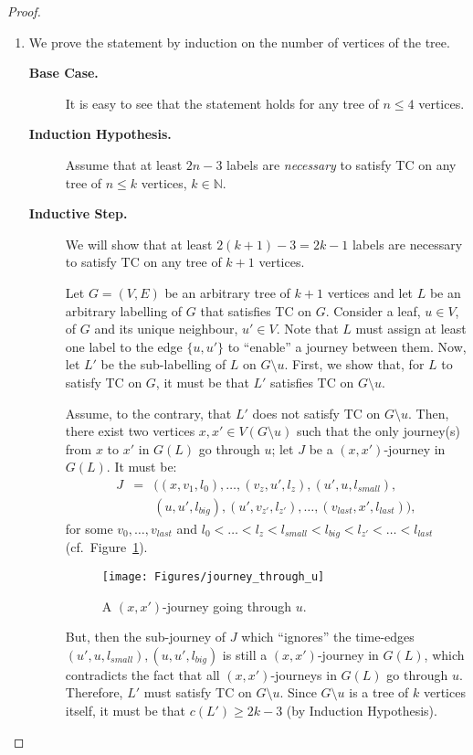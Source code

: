 \documentclass[a4paper,UKenglish]{article}
\begin{document}
\begin{proof}
\begin{enumerate}[label=(\alph*)]

\item\label{item:tree_lower_bound} We prove the statement by induction on the number of vertices of the tree.
\begin{description}
\item[\textbf{Base Case.}] \noindent It is easy to see that the statement holds for any tree of $n\leq 4$ vertices.

\item[\textbf{Induction Hypothesis.}] \noindent Assume that at least $2n-3$ labels are \emph{necessary} to satisfy TC on any tree of $n\leq k$ vertices, $k\in \mathbb{N}$.

\item[\textbf{Inductive Step.}] \noindent We will show that at least $2(k+1)-3=2k-1$ labels are necessary to satisfy TC on any tree of $k+1$ vertices.

Let $G=(V,E)$ be an arbitrary tree of $k+1$ vertices and let $L$ be an arbitrary labelling of $G$ that satisfies TC on $G$. Consider a leaf, $u \in V$, of $G$ and its unique neighbour, $u' \in V$. Note that $L$ must assign at least one label to the edge $\{u,u'\}$ to ``enable'' a journey between them. Now, let $L'$ be the sub-labelling of $L$ on $G\setminus u$. First, we show that, for $L$ to satisfy TC on $G$, it must be that $L'$ satisfies TC on $G \setminus u$.

Assume, to the contrary, that $L'$ does not satisfy TC on $G \setminus u$. Then, there exist two vertices $x,x' \in V(G\setminus u)$ such that the only journey(s) from $x$ to $x'$ in $G(L)$ go through $u$; let $J$ be a $(x,x')$-journey in $G(L)$. It must be:
\begin{eqnarray*}
J &=& \big(  (x,v_1,l_0), \ldots, (v_z,u',l_z), (u',u,l_{small}), \\
  & & (u,u',l_{big}), (u',v_{z'},l_{z'}), \ldots, (v_{last},x',l_{last}) \big) ,
\end{eqnarray*}
for some $v_0, \ldots, v_{last}$ and $l_0<\ldots< l_z<l_{small}<l_{big}< l_{z'} < \ldots <l_{last}$ (cf.~Figure~\ref{fig:journey_through_u}).
\begin{figure}[!htb]
\centering
\texttt{[image: Figures/journey\_through\_u]}
\caption{A $(x,x')$-journey going through $u$.}
\label{fig:journey_through_u}
\end{figure}

But, then the sub-journey of $J$ which ``ignores'' the time-edges $(u',u,l_{small}),(u,u',l_{big})$ is still a $(x,x')$-journey in $G(L)$, which contradicts the fact that all $(x,x')$-journeys in $G(L)$ go through $u$. Therefore, $L'$ must satisfy TC on $G\setminus u$. Since $G\setminus u$ is a tree of $k$ vertices itself, it must be that $c(L')\geq 2k-3$ (by Induction Hypothesis).


\end{description}
\end{enumerate}
\end{proof}
\end{document}
